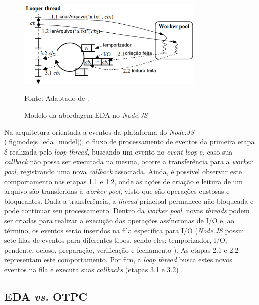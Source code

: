 \documentclass[12pt]{article}
\begin{document}
\begin{figure}[h]
\centering
\caption{Modelo da abordagem EDA no \textit{Node.JS}}
\includegraphics[width=0.8\textwidth]{images/pt-br/eda-arch-nodejs.png}
\label{fig:nodejs_eda_model}

Fonte: Adaptado de \cite{BUGS}.
\end{figure}

Na arquitetura orientada a eventos da plataforma do \textit{Node.JS} (\autoref{fig:nodejs_eda_model}), 
o fluxo de processamento de eventos da primeira etapa é realizada pelo \textit{loop thread}, 
buscando um evento no \textit{event loop} e, caso sua \textit{callback} não possa ser executada na mesma, ocorre
a transferência para a \textit{worker pool}, registrando uma nova \textit{callback} associada. 
Ainda, é possível observar este comportamento nas etapas 1.1 e 1.2, onde as ações de criação e leitura de 
um arquivo são transferidas à \textit{worker pool}, visto que são operações custosas e bloqueantes. Dada 
a transferência, a \textit{thread} principal permanece não-bloqueada e pode continuar seu processamento. 
Dentro da \textit{worker pool}, novas \textit{threads} podem ser criadas para realizar a execução das operações
assíncronas de I/O e, ao término, os eventos serão inseridos na fila específica para I/O (\textit{Node.JS} 
possui sete filas de eventos para diferentes tipos, sendo eles: temporizador, I/O, pendente, ocioso, preparação, 
verificação e fechamento \cite{NODEEVENTLOOP}). As etapas 2.1 e 2.2 representam este comportamento.
Por fim, a \textit{loop thread} busca estes novos eventos na fila e executa suas 
\textit{callbacks} (etapas 3.1 e 3.2) \cite{BUGS}.


\subsection{EDA \textit{vs.} OTPC}
\end{document}
